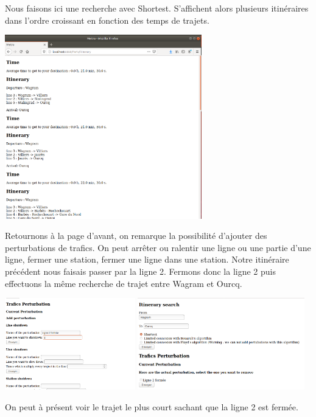 \documentclass[french, 12pt]{article}
\begin{document}
Nous faisons ici une recherche avec Shortest. S'affichent alors plusieurs itinéraires dans l'ordre croissant en fonction des temps de trajets.

\includegraphics[height=8cm]{images/itineraryWithoutPbs.png}

Retournons à la page d'avant, on remarque la possibilité d'ajouter des perturbations de trafics. On peut arrêter ou ralentir une ligne ou une partie d'une ligne, fermer une station, fermer une ligne dans une station. Notre itinéraire précédent nous faisais passer par la ligne 2. Fermons donc la ligne 2 puis effectuons la même recherche de trajet entre Wagram et Ourcq.

\includegraphics[height=4cm]{images/traficsPerturb.png}
\includegraphics[height=4cm]{images/researchWithPbs.png}

On peut à présent voir le trajet le plus court sachant que la ligne 2 est fermée.
\end{document}
